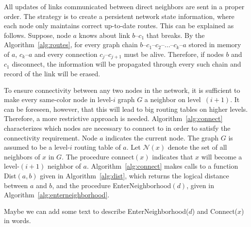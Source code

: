 \documentclass[conference]{IEEEtran}
\theoremstyle{definition}
\newcommand{\cN}{{\mathcal{N}}}
\begin{document}


All updates of links communicated between direct neighbors are sent in a proper order. The strategy is to create a persistent network state information, where each node only maintains correct up-to-date routes. This can be explained as follows. Suppose, node $a$ knows about link $b$--$c_1$ that breaks. By the Algorithm~\ref{alg:routes}, for every graph chain $b$--$c_1$--$c_2$--...--$c_k$--$a$ stored in memory of $a$, $c_k$--$a$ and every connection $c_j$--$c_{j+1}$ must be alive. Therefore, if nodes $b$ and $c_1$ disconnect, the information will be propagated through every such chain and record of the link will be erased.

To ensure connectivity between any two nodes in the network, it is sufficient to make every same-color node in level-$i$ graph $G$ a neighbor on level~$(i+1)$. It can be foreseen, however, that this will lead to big routing tables on higher levels. Therefore, a more restrictive approach is needed.
Algorithm~\ref{alg:connect} characterizes which nodes are necessary to connect to in order to satisfy the connectivity requirement. Node $a$ indicates the current node. 
The graph
$G$ is assumed to be a level-$i$ routing table of $a$.   
Let $\cN(x)$ denote the set of all neighbors of $x$ in $G$.  The procedure  connect$(x)$ indicates that $x$ will become a level-$(i+1)$ neighbor of $a$.  Algorithm~\ref{alg:connect} makes calls to a function
Dist$(a,b)$ given in Algorithm~\ref{alg:dist}, which returns the logical distance between $a$ and $b$,
and the procedure EnterNeighborhood$(d)$, given in Algorithm~\ref{alg:enterneighborhood}.

{\color{red} Maybe we can add some text to describe EnterNeighborhood($d$) and Connect($x$) in words.}
\end{document}
